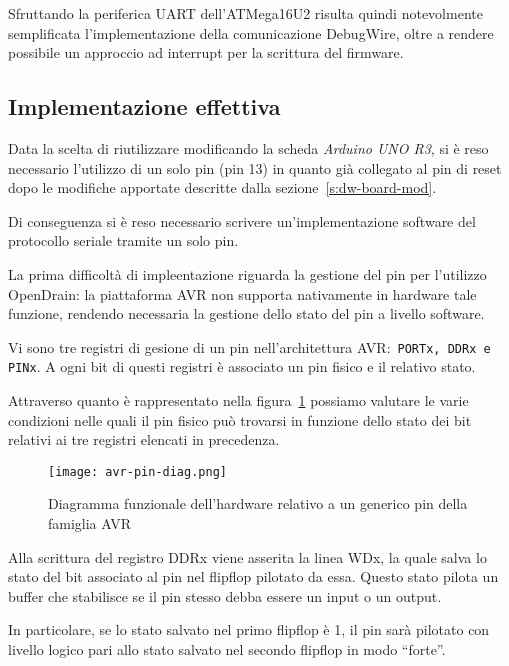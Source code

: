 Sfruttando la periferica UART dell'ATMega16U2 risulta quindi notevolmente semplificata l'implementazione della comunicazione DebugWire, oltre a rendere possibile un approccio ad interrupt per la scrittura del firmware.

\subsection{Implementazione effettiva}

Data la scelta di riutilizzare modificando la scheda \textit{Arduino UNO R3}, si è reso necessario l'utilizzo di un solo pin (pin 13) in quanto già collegato al pin di reset dopo le modifiche apportate descritte dalla sezione~\ref{s:dw-board-mod}.

Di conseguenza si è reso necessario scrivere un'implementazione software del protocollo seriale tramite un solo pin.

La prima difficoltà di impleentazione riguarda la gestione del pin per l'utilizzo OpenDrain: la piattaforma AVR non supporta nativamente in hardware tale funzione, rendendo necessaria la gestione dello stato del pin a livello software.

Vi sono tre registri di gesione di un pin nell'architettura AVR:\ \texttt{PORTx, DDRx e PINx}. A ogni bit di questi registri è associato un pin fisico e il relativo stato.

Attraverso quanto è rappresentato nella figura~\ref{fig:avr-pin} possiamo valutare le varie condizioni nelle quali il pin fisico può trovarsi in funzione dello stato dei bit relativi ai tre registri elencati in precedenza.

\begin{figure}[t]
    \centering
    \texttt{[image: avr-pin-diag.png]}
    \caption[Immagine ottenuta dal documento\cite{avr:m16u2}, fig. 12-2]{Diagramma funzionale dell'hardware relativo a un generico pin della famiglia AVR\cite[fig. 12-2]{avr:m16u2}}\label{fig:avr-pin}
\end{figure}

Alla scrittura del registro DDRx viene asserita la linea WDx, la quale salva lo stato del bit associato al pin nel flipflop pilotato da essa. Questo stato pilota un buffer che stabilisce se il pin stesso debba essere un input o un output.

In particolare, se lo stato salvato nel primo flipflop è 1, il pin sarà pilotato con livello logico pari allo stato salvato nel secondo flipflop in modo ``forte''.

